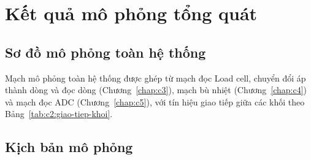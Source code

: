 \chapter{Kết quả mô phỏng tổng quát}
\label{chap:c6}

\section{Sơ đồ mô phỏng toàn hệ thống}
\label{sec:c6:so-do}

Mạch mô phỏng toàn hệ thống được ghép từ mạch đọc Load cell, chuyển đổi áp thành dòng và đọc dòng
(Chương~\ref{chap:c3}), mạch bù nhiệt (Chương~\ref{chap:c4}) và mạch đọc ADC (Chương~\ref{chap:c5}),
với tín hiệu giao tiếp giữa các khối theo Bảng~\ref{tab:c2:giao-tiep-khoi}.



\section{Kịch bản mô phỏng}
\label{sec:c6:kich-ban}

